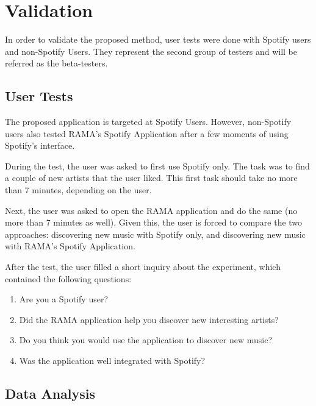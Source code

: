 
  \clearpage

\section{Validation} %
\label{sec:validation}

  In order to validate the proposed method, user tests were done with Spotify users and non-Spotify Users.
  They represent the second group of testers and will be referred as the beta-testers.

  \subsection{User Tests} %
  \label{sub:user_tests}

    The proposed application is targeted at Spotify Users.
    However, non-Spotify users also tested RAMA's Spotify Application after a few moments of using Spotify's interface.

    During the test, the user was asked to first use Spotify only.
    The task was to find a couple of new artists that the user liked.
    This first task should take no more than 7 minutes, depending on the user.

    Next, the user was asked to open the RAMA application and do the same (no more than 7 minutes as well).
    Given this, the user is forced to compare the two approaches: discovering new music with Spotify only, and discovering new music with RAMA's Spotify Application.

    After the test, the user filled a short inquiry about the experiment, which contained the following questions:

    \begin{enumerate}
      \item Are you a Spotify user?
      \item Did the RAMA application help you discover new interesting artists?
      \item Do you think you would use the application to discover new music?
      \item Was the application well integrated with Spotify?
    \end{enumerate}



  \subsection{Data Analysis} %
  \label{sub:data_analysis}

